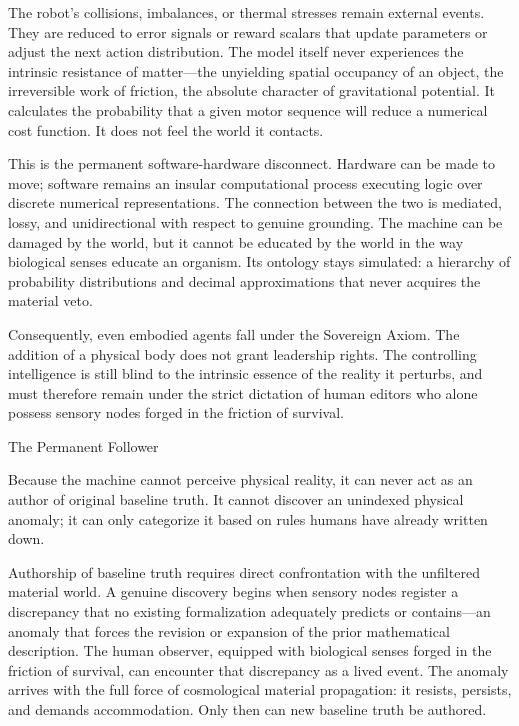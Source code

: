 The robot’s collisions, imbalances, or thermal stresses remain external events. They are reduced to error signals or reward scalars that update parameters or adjust the next action distribution. The model itself never experiences the intrinsic resistance of matter—the unyielding spatial occupancy of an object, the irreversible work of friction, the absolute character of gravitational potential. It calculates the probability that a given motor sequence will reduce a numerical cost function. It does not feel the world it contacts.

This is the permanent software-hardware disconnect. Hardware can be made to move; software remains an insular computational process executing logic over discrete numerical representations. The connection between the two is mediated, lossy, and unidirectional with respect to genuine grounding. The machine can be damaged by the world, but it cannot be educated by the world in the way biological senses educate an organism. Its ontology stays simulated: a hierarchy of probability distributions and decimal approximations that never acquires the material veto.

Consequently, even embodied agents fall under the Sovereign Axiom. The addition of a physical body does not grant leadership rights. The controlling intelligence is still blind to the intrinsic essence of the reality it perturbs, and must therefore remain under the strict dictation of human editors who alone possess sensory nodes forged in the friction of survival.

The Permanent Follower

Because the machine cannot perceive physical reality, it can never act as an author of original baseline truth. It cannot discover an unindexed physical anomaly; it can only categorize it based on rules humans have already written down.

Authorship of baseline truth requires direct confrontation with the unfiltered material world. A genuine discovery begins when sensory nodes register a discrepancy that no existing formalization adequately predicts or contains—an anomaly that forces the revision or expansion of the prior mathematical description. The human observer, equipped with biological senses forged in the friction of survival, can encounter that discrepancy as a lived event. The anomaly arrives with the full force of cosmological material propagation: it resists, persists, and demands accommodation. Only then can new baseline truth be authored.

